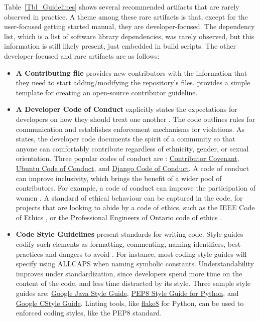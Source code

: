 \documentclass[11pt]{article}
\newcommand{\CC}{C\nolinebreak\hspace{-.05em}\raisebox{.4ex}{\small\bf
+}\nolinebreak\hspace{-.10em}\raisebox{.4ex}{\small\bf +}}
\begin{document}
Table~\ref{Tbl_Guidelines} shows several recommended artifacts that are rarely
observed in practice.  A theme among these rare artifacts is that, except for
the user-focused getting started manual, they are developer-focused.  The
dependency list, which is a list of software library dependencies, was rarely
observed, but this information is still likely present, just embedded in build
scripts. The other developer-focused and rare artifacts are as follows:

\begin{itemize}

\item \textbf{A Contributing file} provides new contributors with the information
that they need to start adding/modifying the repository's files.
\citet{Abdalla2016} provides a simple template for creating an open-source
contributor guideline. 

\item \textbf{A Developer Code of Conduct} explicitly states the expectations
for developers on how they should treat one another \citep{TouraniEtAl2017}. The
code outlines rules for communication and establishes enforcement mechanisms for
violations.  As \citet{TouraniEtAl2017} states, the developer code documents
the spirit of a community so that anyone can comfortably contribute regardless
of ethnicity, gender, or sexual orientation. Three popular codes of conduct are
\citep{TouraniEtAl2017}:
\href{https://www.contributor-covenant.org/version/2/1/code_of_conduct/}
{Contributor Covenant}, \href{https://ubuntu.com/community/code-of-conduct}
{Ubuntu Code of Conduct}, and \href{https://www.djangoproject.com/conduct/}
{Django Code of Conduct}. A code of conduct can improve inclusivity, which
brings the benefit of a wider pool of contributors.  For example, a code of
conduct can improve the participation of women \citep{SinghEtAl2021}. A standard
of ethical behaviour can be captured in the code, for projects that are looking
to abide by a code of ethics, such as the IEEE Code of Ethics \citep{IEEE1999},
or the Professional Engineers of Ontario code of ethics \citep[p.\
23--24]{PEO2021}.

\item \textbf{Code Style Guidelines} present standards for writing code. Style
guides codify such elements as formatting, commenting, naming identifiers, best
practices and dangers to avoid \citep{Carty2020}. For instance, most coding
style guides will specify using ALLCAPS when naming symbolic constants.
Understandability improves under standardization, since developers spend
more time on the content of the code, and less time distracted by its style.
Three sample style guides are:
\href{https://google.github.io/styleguide/javaguide.html} {Google Java Style
Guide},
\href{http://cnl.sogang.ac.kr/cnlab/lectures/programming/python/PEP8_Style_Guide.pdf}
{PEP8 Style Guide for Python}, and
\href{https://google.github.io/styleguide/cppguide.html} {Google \CC Style
Guide}.  Linting tools, like \href{https://pypi.org/project/flake8/}{flake8} for
Python, can be used to enforced coding styles, like the PEP8 standard.


\end{itemize}
\end{document}
